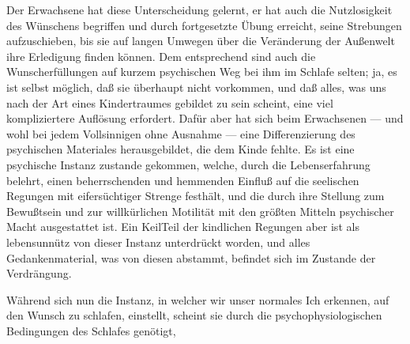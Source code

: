 \documentclass[twoside=true,titlepage=false,open=any, parskip=never, fontsize=10pt, headings=small, chapterprefix=false, appendixprefix=false]{scrbook}
\begin{document}
            
        \pstart
        Der Erwachsene hat diese Unterscheidung gelernt, er hat auch die Nutzlosigkeit
               des Wünschens begriffen und durch fortgesetzte Übung erreicht, seine Strebungen
               aufzuschieben, bis sie auf langen Umwegen über die Veränderung der Außenwelt
               ihre Erledigung finden können. Dem entsprechend sind auch die
               Wunscherfüllungen auf kurzem psychischen Weg bei ihm im Schlafe selten; ja,
               es ist selbst möglich, daß sie überhaupt nicht vorkommen, und daß alles,
               was uns nach der Art eines Kindertraumes gebildet zu sein scheint, eine viel
               kompliziertere Auflösung erfordert. Dafür aber hat sich beim Erwachsenen — und
               wohl bei jedem Vollsinnigen ohne Ausnahme — eine Differenzierung des psychischen
               Materiales herausgebildet, die dem Kinde fehlte. Es ist eine psychische
               Instanz zustande gekommen, welche, durch die Lebenserfahrung belehrt, einen
               beherrschenden und hemmenden Einfluß auf die seelischen Regungen mit
               eifersüchtiger Strenge festhält, und die durch ihre Stellung zum Bewußtsein und
               zur willkürlichen Motilität mit den größten Mitteln psychischer Macht
               ausgestattet ist. Ein KeilTeil der kindlichen Regungen aber ist als
               lebensunnütz von dieser Instanz unterdrückt worden, und alles Gedankenmaterial, was von diesen abstammt, befindet sich im Zustande der
               Verdrängung.
        \pend
    
            
        \pstart
        Während sich nun die Instanz, in welcher wir unser normales Ich erkennen, auf
               den Wunsch zu schlafen, einstellt, scheint sie durch die psychophysiologischen
               Bedingungen des Schlafes genötigt,
        \pend
    
         
            
            
            
\end{document}
